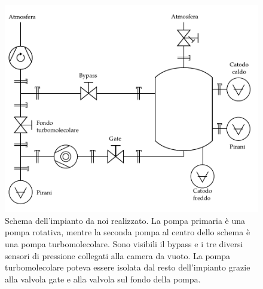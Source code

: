 \begin{figure}[b!]
    \centering
   \includegraphics[width=15.5cm]{drawing.pdf}
   \caption{Schema dell'impianto da noi realizzato. La pompa primaria è una pompa rotativa, mentre la seconda pompa al centro dello schema
   è una pompa turbomolecolare. Sono visibili il bypass e i tre diversi sensori di pressione collegati alla camera da vuoto. La pompa
   turbomolecolare poteva essere isolata dal resto dell'impianto grazie alla valvola gate e alla valvola sul fondo della pompa.}
   \label{fig:schema}
\end{figure}
